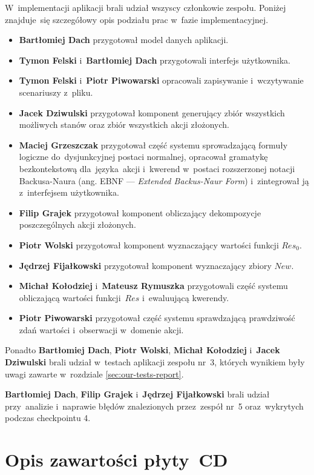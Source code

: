 \documentclass[11pt,a4paper]{article}
\begin{document}
W~implementacji aplikacji brali udział wszyscy członkowie zespołu.
Poniżej znajduje~się szczegółowy opis podziału prac w~fazie implementacyjnej.

\begin{itemize}
    \item \textbf{Bartłomiej Dach} przygotował model danych aplikacji.
    \item \textbf{Tymon Felski} i~\textbf{Bartłomiej Dach} przygotowali interfejs użytkownika.
    \item \textbf{Tymon Felski} i~\textbf{Piotr Piwowarski} opracowali zapisywanie i~wczytywanie scenariuszy z~pliku.
    \item \textbf{Jacek Dziwulski} przygotował komponent generujący zbiór wszystkich możliwych stanów oraz zbiór wszystkich akcji złożonych.
    \item \textbf{Maciej Grzeszczak} przygotował część systemu sprowadzającą formuły logiczne do~dysjunkcyjnej postaci normalnej, opracował gramatykę bezkontekstową dla~języka~akcji i~kwerend w~postaci rozszerzonej notacji Backusa-Naura (ang. EBNF --- \emph{Extended Backus-Naur Form}) i~zintegrował ją z~interfejsem użytkownika.
    \item \textbf{Filip Grajek} przygotował komponent obliczający dekompozycje poszczególnych akcji złożonych.
    \item \textbf{Piotr Wolski} przygotował komponent wyznaczający wartości funkcji ${Res}_0$.
    \item \textbf{Jędrzej Fijałkowski} przygotował komponent wyznaczający zbiory $New$.
    \item \textbf{Michał Kołodziej} i~\textbf{Mateusz Rymuszka} przygotowali część systemu obliczającą wartości funkcji~$Res$ i~ewaluującą kwerendy.
    \item \textbf{Piotr Piwowarski} przygotował część systemu sprawdzającą prawdziwość zdań wartości i~obserwacji w~domenie akcji.
\end{itemize}

Ponadto \textbf{Bartłomiej Dach}, \textbf{Piotr Wolski}, \textbf{Michał Kołodziej} i~\textbf{Jacek Dziwulski} brali udział w~testach aplikacji zespołu nr~3, których wynikiem były uwagi zawarte w~rozdziale \ref{sec:our-tests-report}.

\textbf{Bartłomiej Dach}, \textbf{Filip Grajek} i~\textbf{Jędrzej Fijałkowski} brali udział przy~analizie i~naprawie błędów znalezionych przez~zespół nr~5 oraz~wykrytych podczas checkpointu 4.

\section{Opis zawartości płyty~CD}
\end{document}
